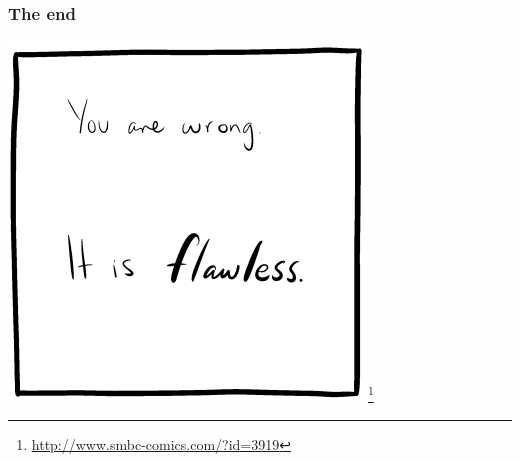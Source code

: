 \documentclass[aspectratio=169]{beamer}
\begin{document}
\begin{frame}
\begin{center}
\frametitle{The end}
\includegraphics[scale=0.5]{smbc_comic_votey}\footnote{\url{http://www.smbc-comics.com/?id=3919}}
\end{center}
\end{frame}

\end{document}
